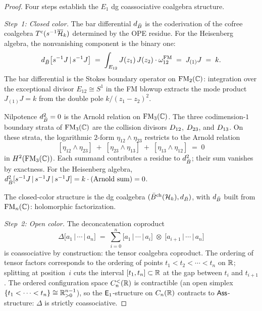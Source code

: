 \begin{proof}
Four steps establish the $E_1$ dg coassociative coalgebra structure.

\medskip
\noindent\textit{Step~1: Closed color.}\enspace
The bar differential $d_{\bar{B}}$ is the coderivation of the cofree coalgebra $T^c(s^{-1}\overline{\mathcal{H}}_k)$ determined by the OPE residue. For the Heisenberg algebra, the nonvanishing component is the binary one:
\begin{equation}\label{eq:rosetta-dbar-binary}
d_{\bar{B}}\bigl[s^{-1}J \,|\, s^{-1}J\bigr]
\;=\;
\int_{E_{12}}
 J(z_1)\, J(z_2) \cdot \omega_{12}^{\mathrm{FM}}
\;=\;
J_{(1)}J
\;=\; k.
\end{equation}
The bar differential is the Stokes boundary operator on $\mathrm{FM}_2(\mathbb{C})$: integration over the exceptional divisor $E_{12} \cong S^1$ in the FM blowup extracts the mode product $J_{(1)}J = k$ from the double pole $k/(z_1 - z_2)^2$.

Nilpotence $d_{\bar{B}}^2 = 0$ is the Arnold relation on $\mathrm{FM}_3(\mathbb{C})$. The three codimension-$1$ boundary strata of $\mathrm{FM}_3(\mathbb{C})$ are the collision divisors $D_{12}$, $D_{23}$, and $D_{13}$. On these strata, the logarithmic $2$-form $\eta_{12} \wedge \eta_{23}$ restricts to the Arnold relation
\begin{equation}\label{eq:rosetta-arnold}
[\eta_{12} \wedge \eta_{23}]
\;+\;
[\eta_{23} \wedge \eta_{13}]
\;+\;
[\eta_{13} \wedge \eta_{12}]
\;=\; 0
\end{equation}
in $H^2(\mathrm{FM}_3(\mathbb{C}))$. Each summand contributes a residue to $d_{\bar{B}}^2$; their sum vanishes by exactness. For the Heisenberg algebra, $d_{\bar{B}}^2[s^{-1}J \,|\, s^{-1}J \,|\, s^{-1}J] = k \cdot (\text{Arnold sum}) = 0$.

The closed-color structure is the dg coalgebra $(\bar{B}^{\mathrm{ch}}(\mathcal{H}_k), d_{\bar{B}})$, with $d_{\bar{B}}$ built from $\mathrm{FM}_n(\mathbb{C})$: holomorphic factorization.

\medskip
\noindent\textit{Step~2: Open color.}\enspace
The deconcatenation coproduct
\begin{equation}\label{eq:rosetta-delta}
\Delta\bigl[a_1 \,|\, \cdots \,|\, a_n\bigr]
\;=\;
\sum_{i=0}^{n}
\bigl[a_1 \,|\, \cdots \,|\, a_i\bigr]
\;\otimes\;
\bigl[a_{i+1} \,|\, \cdots \,|\, a_n\bigr]
\end{equation}
is coassociative by construction: the tensor coalgebra coproduct. The ordering of tensor factors corresponds to the ordering of points $t_1 < t_2 < \cdots < t_n$ on $\mathbb{R}$; splitting at position~$i$ cuts the interval $[t_1, t_n] \subset \mathbb{R}$ at the gap between $t_i$ and $t_{i+1}$. The ordered configuration space $C_n^{<}(\mathbb{R})$ is contractible (an open simplex $\{t_1 < \cdots < t_n\} \cong \mathbb{R}^{n-1}_{> 0}$), so the $\mathsf{E}_1$-structure on $C_n(\mathbb{R})$ contracts to $\mathsf{Ass}$-structure: $\Delta$ is strictly coassociative.


\end{proof}
